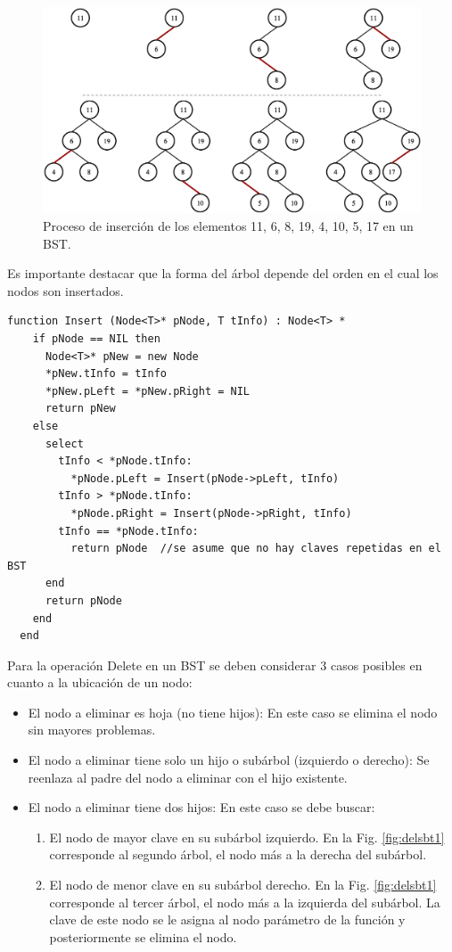 \begin{figure}[htpb!]
  \begin{center}
    \includegraphics[width=1.0\textwidth]{images/BSTInsert.eps}
  \end{center}
  \caption{Proceso de inserción de los elementos 11, 6, 8, 19, 4, 10, 5, 17 en un BST.}
  \label{fig:BSTInsert}
\end{figure}

Es importante destacar que la forma del árbol depende del orden en el cual los nodos son insertados.

\begin{lstlisting}[upquote=true, language=pseudo]
  function Insert (Node<T>* pNode, T tInfo) : Node<T> *
    if pNode == NIL then
      Node<T>* pNew = new Node
      *pNew.tInfo = tInfo
      *pNew.pLeft = *pNew.pRight = NIL
      return pNew
    else
      select
        tInfo < *pNode.tInfo:
          *pNode.pLeft = Insert(pNode->pLeft, tInfo)
        tInfo > *pNode.tInfo:  
          *pNode.pRight = Insert(pNode->pRight, tInfo)
        tInfo == *pNode.tInfo:
          return pNode	//se asume que no hay claves repetidas en el BST
      end
      return pNode
    end
  end
\end{lstlisting}

Para la operación Delete en un BST se deben considerar 3 casos posibles en cuanto a la ubicación de un nodo:
\begin{itemize}
\item El nodo a eliminar es hoja (no tiene hijos): En este caso se elimina el nodo sin
mayores problemas.
\item El nodo a eliminar tiene solo un hijo o subárbol (izquierdo o derecho): Se reenlaza
al padre del nodo a eliminar con el hijo existente.
\item El nodo a eliminar tiene dos hijos: En este caso se debe buscar:
\begin{enumerate}
\item El nodo de mayor clave en su subárbol izquierdo. En la Fig. \ref{fig:delsbt1} corresponde al segundo árbol, el nodo más a la derecha del subárbol.
\item El nodo de menor clave en su subárbol derecho. En la Fig. \ref{fig:delsbt1} corresponde al tercer árbol, el nodo más a la izquierda del subárbol.
La clave de este nodo se le asigna al nodo parámetro de la función y posteriormente se elimina el nodo.
\end{enumerate}
\end{itemize}

